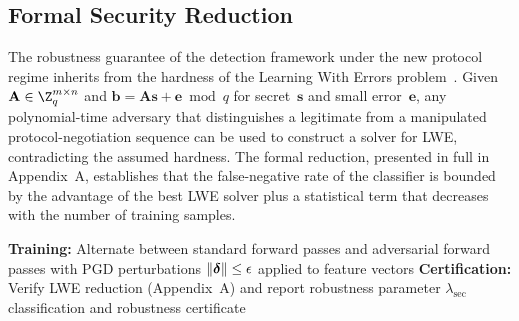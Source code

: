 \subsection{Formal Security Reduction}

The robustness guarantee of the detection framework under the new protocol regime inherits from the hardness of the Learning With Errors problem~\cite{Regev2009,Peikert2016}. Given $\mathbf{A}\in\Z_q^{m\times n}$ and $\mathbf{b}=\mathbf{A}\mathbf{s}+\mathbf{e}\bmod q$ for secret~$\mathbf{s}$ and small error~$\mathbf{e}$, any polynomial-time adversary that distinguishes a legitimate from a manipulated protocol-negotiation sequence can be used to construct a solver for LWE, contradicting the assumed hardness. The formal reduction, presented in full in Appendix~A, establishes that the false-negative rate of the classifier is bounded by the advantage of the best LWE solver plus a statistical term that decreases with the number of training samples.

\begin{algorithm}[htbp]
\caption{Forward-Compatible Multi-Protocol Detection}\label{alg:pqidps}
\textbf{Training:} Alternate between standard forward passes and adversarial forward passes with PGD perturbations $\|\boldsymbol{\delta}\|\le\epsilon$ applied to feature vectors\;
\textbf{Certification:} Verify LWE reduction (Appendix~A) and report robustness parameter $\lambda_{\mathrm{sec}}$\;
\Return classification and robustness certificate
\end{algorithm}


